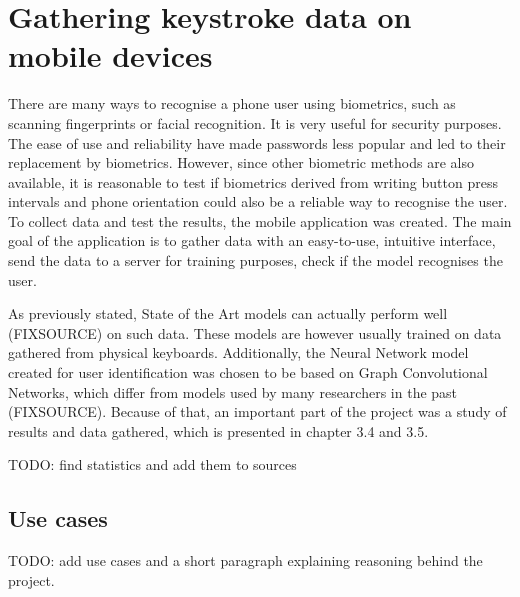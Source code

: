 
\chapter{Gathering keystroke data on mobile devices}

There are many ways to recognise a phone user using biometrics, such as scanning fingerprints or facial recognition. It is very useful for security purposes. The ease of use and reliability have made passwords less popular and led to their replacement by biometrics. However, since other biometric methods are also available, it is reasonable to test if biometrics derived from writing button press intervals and phone orientation could also be a reliable way to recognise the user. To collect data and test the results, the mobile application was created.
The main goal of the application is to gather data with an easy-to-use, intuitive interface, send the data to a server for training purposes, check if the model recognises the user. 

As previously stated, State of the Art models can actually perform well (FIXSOURCE) on such data. These models are however usually trained on data gathered from physical keyboards. Additionally, the Neural Network model created for user identification was chosen to be based on Graph Convolutional Networks, which differ from models used by many researchers in the past (FIXSOURCE).
Because of that, an important part of the project was a study of results and data gathered, which is presented in chapter 3.4 and 3.5.

TODO: find statistics and add them to sources

\section{Use cases}
TODO: add use cases and a short paragraph explaining reasoning behind the project.